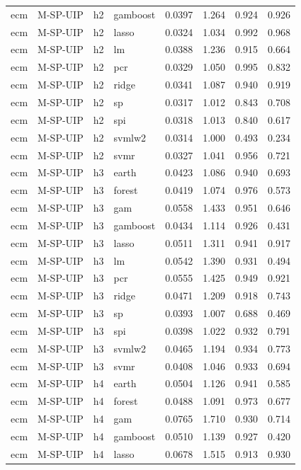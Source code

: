\begin{ThreePartTable}
\begin{longtable}[t]{llclcccc}
ecm & M-SP-UIP & h2 & gamboost & 0.0397 & 1.264 & 0.924 & 0.926\\
ecm & M-SP-UIP & h2 & lasso & 0.0324 & 1.034 & 0.992 & 0.968\\
ecm & M-SP-UIP & h2 & lm & 0.0388 & 1.236 & 0.915 & 0.664\\
ecm & M-SP-UIP & h2 & pcr & 0.0329 & 1.050 & 0.995 & 0.832\\
ecm & M-SP-UIP & h2 & ridge & 0.0341 & 1.087 & 0.940 & 0.919\\
ecm & M-SP-UIP & h2 & sp & 0.0317 & 1.012 & 0.843 & 0.708\\
ecm & M-SP-UIP & h2 & spi & 0.0318 & 1.013 & 0.840 & 0.617\\
ecm & M-SP-UIP & h2 & svmlw2 & 0.0314 & 1.000 & 0.493 & 0.234\\
ecm & M-SP-UIP & h2 & svmr & 0.0327 & 1.041 & 0.956 & 0.721\\
\addlinespace
ecm & M-SP-UIP & h3 & earth & 0.0423 & 1.086 & 0.940 & 0.693\\
ecm & M-SP-UIP & h3 & forest & 0.0419 & 1.074 & 0.976 & 0.573\\
ecm & M-SP-UIP & h3 & gam & 0.0558 & 1.433 & 0.951 & 0.646\\
ecm & M-SP-UIP & h3 & gamboost & 0.0434 & 1.114 & 0.926 & 0.431\\
ecm & M-SP-UIP & h3 & lasso & 0.0511 & 1.311 & 0.941 & 0.917\\
ecm & M-SP-UIP & h3 & lm & 0.0542 & 1.390 & 0.931 & 0.494\\
ecm & M-SP-UIP & h3 & pcr & 0.0555 & 1.425 & 0.949 & 0.921\\
ecm & M-SP-UIP & h3 & ridge & 0.0471 & 1.209 & 0.918 & 0.743\\
ecm & M-SP-UIP & h3 & sp & 0.0393 & 1.007 & 0.688 & 0.469\\
ecm & M-SP-UIP & h3 & spi & 0.0398 & 1.022 & 0.932 & 0.791\\
ecm & M-SP-UIP & h3 & svmlw2 & 0.0465 & 1.194 & 0.934 & 0.773\\
ecm & M-SP-UIP & h3 & svmr & 0.0408 & 1.046 & 0.933 & 0.694\\
\addlinespace
ecm & M-SP-UIP & h4 & earth & 0.0504 & 1.126 & 0.941 & 0.585\\
ecm & M-SP-UIP & h4 & forest & 0.0488 & 1.091 & 0.973 & 0.677\\
ecm & M-SP-UIP & h4 & gam & 0.0765 & 1.710 & 0.930 & 0.714\\
ecm & M-SP-UIP & h4 & gamboost & 0.0510 & 1.139 & 0.927 & 0.420\\
ecm & M-SP-UIP & h4 & lasso & 0.0678 & 1.515 & 0.913 & 0.930\\

\end{longtable}
\end{ThreePartTable}
